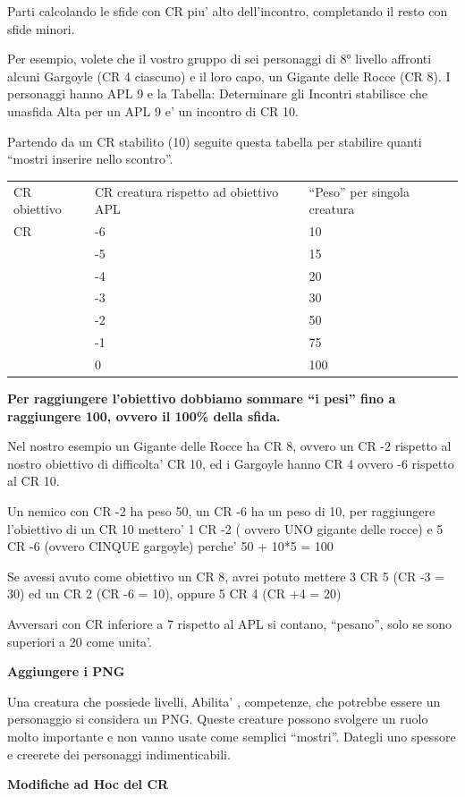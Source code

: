 \documentclass[a4paper,11pt,twoside,openany]{dndbook}
\begin{document}
{Parti calcolando le sfide con CR piu' alto dell'incontro, completando il resto con sfide minori.

Per esempio, volete che il vostro gruppo di sei personaggi di 8° livello affronti alcuni Gargoyle (CR 4 ciascuno) e il loro capo, un Gigante delle Rocce (CR 8). I personaggi hanno APL 9 e la Tabella: Determinare gli Incontri stabilisce che unasfida Alta per un APL 9 e' un incontro di CR 10.

Partendo da un CR stabilito (10) seguite questa tabella per stabilire quanti ``mostri inserire nello scontro''.

\bigskip

\begin{tabular}[c]{@{}lll@{}}
\toprule 
CR obiettivo & CR creatura rispetto ad obiettivo APL & ``Peso'' per singola creatura\tabularnewline
CR & -6 & 10\tabularnewline
 & -5 & 15\tabularnewline
 & -4 & 20\tabularnewline
 & -3 & 30\tabularnewline
 & -2 & 50\tabularnewline
 & -1 & 75\tabularnewline
 & 0 & 100\tabularnewline
\bottomrule
\end{tabular}

\bigskip

\textbf{Per raggiungere l'obiettivo dobbiamo sommare ``i pesi''
fino a raggiungere 100, ovvero il 100\% della sfida.}

Nel nostro esempio un Gigante delle Rocce ha CR 8, ovvero un CR -2 rispetto al nostro obiettivo di difficolta' CR 10, ed i Gargoyle hanno CR 4 ovvero -6 rispetto al CR 10.

Un nemico con CR -2 ha peso 50, un CR -6 ha un peso di 10, per raggiungere l'obiettivo di un CR 10 mettero' 1 CR -2 ( ovvero UNO gigante delle rocce) e 5 CR -6 (ovvero CINQUE gargoyle) perche' 50 + 10{*}5 = 100

Se avessi avuto come obiettivo un CR 8, avrei potuto mettere 3 CR 5 (CR -3 = 30) ed un CR 2 (CR -6 = 10), oppure 5 CR 4 (CR +4 = 20)

Avversari con CR inferiore a 7 rispetto al APL si contano, ``pesano'', solo se sono superiori a 20 come unita'.

\textbf{Aggiungere i PNG}

Una creatura che possiede livelli, Abilita' , competenze, che potrebbe essere un personaggio si considera un PNG. Queste creature possono svolgere un ruolo molto importante e non vanno usate come semplici ``mostri''. Dategli uno spessore e creerete dei personaggi indimenticabili.

\textbf{Modifiche ad Hoc del CR}

}
\end{document}
